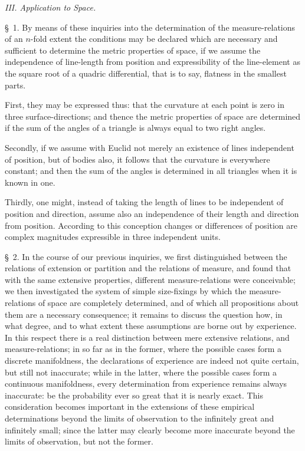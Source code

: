 \documentclass[a4paper,12pt]{article}
\begin{document}
\begin{center}
\emph{III. Application to Space.}
\end{center}

\S~1.
By means of these inquiries into the determination of the
measure-relations of an $n$-fold extent the conditions may be
declared which are necessary and sufficient to determine the
metric properties of space, if we assume the independence of
line-length from position and expressibility of the line-element
as the square root of a quadric differential, that is to say,
flatness in the smallest parts.

First, they may be expressed thus: that the curvature at each
point is zero in three surface-directions; and thence the metric
properties of space are determined if the sum of the angles of a
triangle is always equal to two right angles.

Secondly, if we assume with Euclid not merely an existence of
lines independent of position, but of bodies also, it follows
that the curvature is everywhere constant; and then the sum of
the angles is determined in all triangles when it is known in
one.

Thirdly, one might, instead of taking the length of lines to be
independent of position and direction, assume also an
independence of their length and direction from position.
According to this conception changes or differences of position
are complex magnitudes expressible in three independent units.

\bigbreak

\S~2.
In the course of our previous inquiries, we first
distinguished between the relations of extension or partition and
the relations of measure, and found that with the same extensive
properties, different measure-relations were conceivable; we then
investigated the system of simple size-fixings by which the
measure-relations of space are completely determined, and of
which all propositions about them are a necessary consequence; it
remains to discuss the question how, in what degree, and to what
extent these assumptions are borne out by experience.  In this
respect there is a real distinction between mere extensive
relations, and measure-relations; in so far as in the former,
where the possible cases form a discrete manifoldness, the
declarations of experience are indeed not quite certain, but
still not inaccurate; while in the latter, where the possible
cases form a continuous manifoldness, every determination from
experience remains always inaccurate: be the probability ever so
great that it is nearly exact.  This consideration becomes
important in the extensions of these empirical determinations
beyond the limits of observation to the infinitely great and
infinitely small; since the latter may clearly become more
inaccurate beyond the limits of observation, but not the former.
\end{document}
